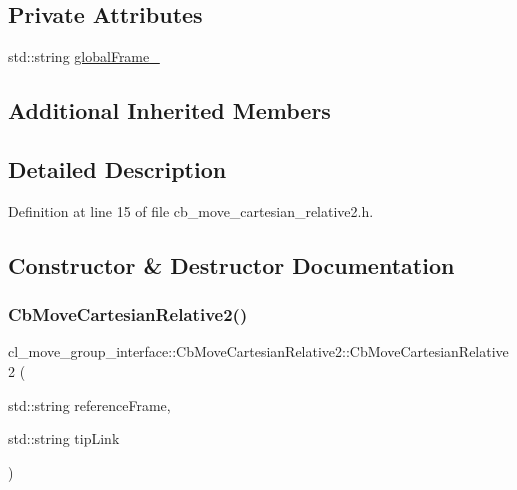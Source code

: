 \subsection*{Private Attributes}
\begin{DoxyCompactItemize}
\item 
std\+::string \hyperlink{classcl__move__group__interface_1_1CbMoveCartesianRelative2_ac33f1b3f077e191cda9b0b5f9f8c1f34}{global\+Frame\+\_\+}
\end{DoxyCompactItemize}
\subsection*{Additional Inherited Members}


\subsection{Detailed Description}


Definition at line 15 of file cb\+\_\+move\+\_\+cartesian\+\_\+relative2.\+h.



\subsection{Constructor \& Destructor Documentation}
\mbox{\label{classcl__move__group__interface_1_1CbMoveCartesianRelative2_ad6cf2bdb1e7f6ad757641eea18127918}} 
\subsubsection{\texorpdfstring{Cb\+Move\+Cartesian\+Relative2()}{CbMoveCartesianRelative2()}\hspace{0.1cm}{\footnotesize\ttfamily [1/2]}}
{\footnotesize\ttfamily cl\+\_\+move\+\_\+group\+\_\+interface\+::\+Cb\+Move\+Cartesian\+Relative2\+::\+Cb\+Move\+Cartesian\+Relative2 (\begin{DoxyParamCaption}\item[{std\+::string}]{reference\+Frame,  }\item[{std\+::string}]{tip\+Link }\end{DoxyParamCaption})\hspace{0.3cm}{\ttfamily [inline]}}



